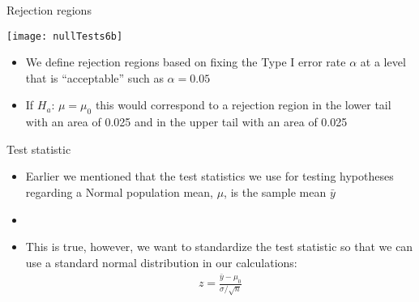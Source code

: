 \documentclass[xcolor=dvipsnames]{beamer}
\begin{document}
\begin{frame}{Rejection regions}
	\begin{center}
		\texttt{[image: nullTests6b]}
	\end{center}
	\begin{itemize}
		\item We define rejection regions based on fixing the Type I error rate $\alpha$ at a level that is ``acceptable'' such as $\alpha = 0.05$  \pause
		\item If $H_a$: $\mu = \mu_0$ this would correspond to a rejection region in the lower tail with an area of 0.025 and in the upper tail with an area of 0.025
	\end{itemize}
\end{frame}

\begin{frame}{Test statistic}
	\begin{itemize}
		\item Earlier we mentioned that the test statistics we use for testing hypotheses regarding a Normal population mean, $\mu$, is the sample mean $\bar{y}$  \pause
		\item[]
		\item This is true, however, we want to standardize the test statistic so that we can use a standard normal distribution in our calculations:
		\begin{gather*}
			z = \frac{\bar{y} - \mu_0}{\sigma / \sqrt{n}}
		\end{gather*}
	\end{itemize}
\end{frame}
\end{document}
